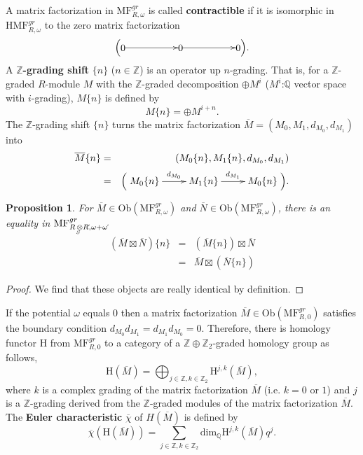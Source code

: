 \documentclass[10pt]{amsart}
\theoremstyle{break}
\newtheorem{pro}[de]{Proposition}
\begin{document}
\indent A matrix factorization in ${{\mathrm{MF}}}^{gr}_{R,\omega}$ is called {\bf contractible} 
if it is isomorphic in ${{\mathrm{HMF}}}^{gr}_{R,\omega}$ to the zero matrix factorization
$$
\Big(
\xymatrix{
*{0}\ar[rr]&&*{0}\ar[rr]&&*{0} 
}
\Big).
$$
\indent
A {\bf ${{\mathbb{Z}}}$-grading shift} $\{ n \}$ ($n \in {{\mathbb{Z}}}$) is an operator up $n$-grading.
That is, for a ${{\mathbb{Z}}}$-graded $R$-module $M$ with the ${{\mathbb{Z}}}$-graded decomposition $\oplus M^i$ ($M^i$:${{\mathbb{Q}}}$ vector space with $i$-grading), $M\{n\}$ is defined by
$$
M\{n\}=\oplus M^{i+n}.
$$
The ${{\mathbb{Z}}}$-grading shift $\{ n \}$ turns the matrix factorization $\overline{M}=(M_0,M_1,d_{M_0},d_{M_1})$ into 
\begin{eqnarray*}
\overline{M}\{n\}&=&(M_0\{ n \},M_1\{ n\},d_{M_0},d_{M_1})\\
&=&\Big( \xymatrix{ M_0\{ n \} \ar[r]^{ d_{M_0} }   &   M_1\{ n\}   \ar[r]^{ d_{M_1} }   &   M_0\{ n\} }\Big).
\end{eqnarray*}
\begin{pro}\label{functor1}
For $\overline{M} \in {{\mathrm{Ob}}}({{\mathrm{MF}}}^{gr}_{R,\omega})$ and $\overline{N} \in {{\mathrm{Ob}}}({{\mathrm{MF}}}^{gr}_{R\acute{},\omega\acute{}})$, 
there is an equality in ${{\mathrm{MF}}}^{gr}_{R{{\,\otimes\hspace{-0.7em}\raisebox{-0.5ex}{${}_{{}_{S}}$}\,}} R\acute{},\omega + \omega \acute{}}$
\begin{eqnarray*}
(\overline{M}\boxtimes \overline{N})\{ n\} &=& (\overline{M}\{ n\} )\boxtimes \overline{N}\\[-0.1em]
&=& \overline{M}\boxtimes (\overline{N}\{ n\} )
\end{eqnarray*}
\end{pro}
\begin{proof}
We find that these objects are really identical by definition. 
\end{proof}
If the potential $\omega$ equals $0$ then a matrix factorization $\overline{M} \in{{\mathrm{Ob}}}({{\mathrm{MF}}}^{gr}_{R,0})$ satisfies the boundary condition $d_{M_0} d_{M_1} = d_{M_1} d_{M_0} =0 $.  
Therefore, there is homology functor ${{\mathrm{H}}}$ from ${{\mathrm{MF}}}^{gr}_{R,0}$ to a category of a ${{\mathbb{Z}}} \oplus {{\mathbb{Z}}}_2$-graded homology group as follows,
$$ {{\mathrm{H}}}(\overline{M})=\bigoplus_{j \in {{\mathbb{Z}}} ,k\in {{\mathbb{Z}}}_2 } {{\mathrm{H}}}^{j,k}(\overline{M}),$$
where $k$ is a complex grading of the matrix factorization $\overline{M}$ (i.e. $k=0$ or $1$) 
and $j$ is a ${{\mathbb{Z}}}$-grading derived from the ${{\mathbb{Z}}}$-graded modules of the matrix factorization $\overline{M}$.
The {\bf Euler characteristic} $\overline{\chi}$ of $H(\overline{M})$ is defined by
\begin{equation*}
\overline{\chi}({{\mathrm{H}}}(\overline{M})) = \sum_{ j \in {{\mathbb{Z}}}, k \in {{\mathbb{Z}}}_2} {{\mathrm{dim}}}_{{\mathbb{Q}}} {{\mathrm{H}}}^{j,k}(\overline{M})  q^{j} \label{euler}.
\end{equation*}
\end{document}
